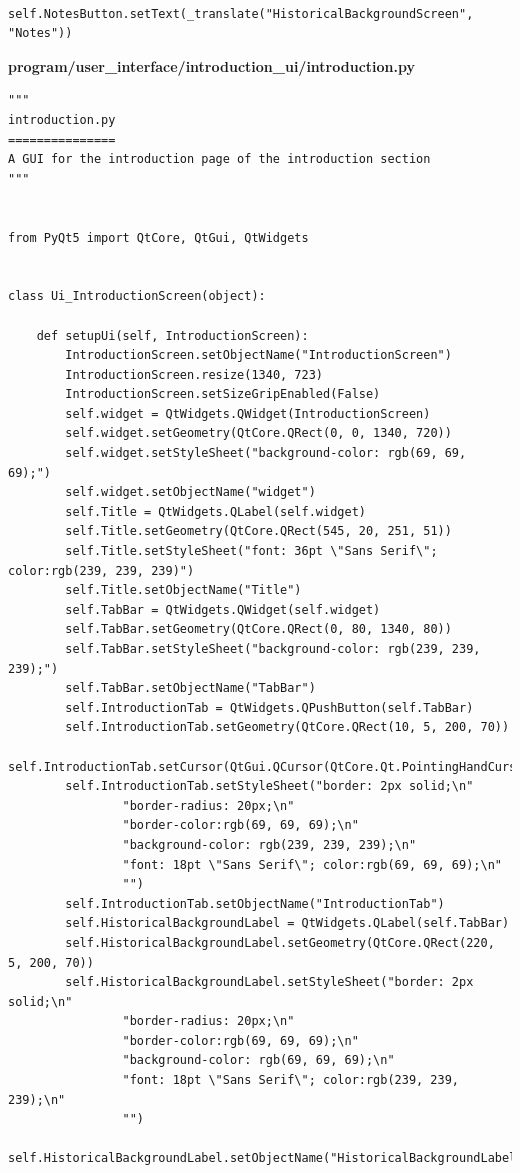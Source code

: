 \documentclass[12pt]{article}
\begin{document}
\begin{lstlisting}
        self.NotesButton.setText(_translate("HistoricalBackgroundScreen", "Notes"))
\end{lstlisting}

\textbf{program/user\_interface/introduction\_ui/introduction.py}
\begin{lstlisting}
"""
introduction.py
===============
A GUI for the introduction page of the introduction section
"""


from PyQt5 import QtCore, QtGui, QtWidgets


class Ui_IntroductionScreen(object):

    def setupUi(self, IntroductionScreen):
        IntroductionScreen.setObjectName("IntroductionScreen")
        IntroductionScreen.resize(1340, 723)
        IntroductionScreen.setSizeGripEnabled(False)
        self.widget = QtWidgets.QWidget(IntroductionScreen)
        self.widget.setGeometry(QtCore.QRect(0, 0, 1340, 720))
        self.widget.setStyleSheet("background-color: rgb(69, 69, 69);")
        self.widget.setObjectName("widget")
        self.Title = QtWidgets.QLabel(self.widget)
        self.Title.setGeometry(QtCore.QRect(545, 20, 251, 51))
        self.Title.setStyleSheet("font: 36pt \"Sans Serif\"; color:rgb(239, 239, 239)")
        self.Title.setObjectName("Title")
        self.TabBar = QtWidgets.QWidget(self.widget)
        self.TabBar.setGeometry(QtCore.QRect(0, 80, 1340, 80))
        self.TabBar.setStyleSheet("background-color: rgb(239, 239, 239);")
        self.TabBar.setObjectName("TabBar")
        self.IntroductionTab = QtWidgets.QPushButton(self.TabBar)
        self.IntroductionTab.setGeometry(QtCore.QRect(10, 5, 200, 70))
        self.IntroductionTab.setCursor(QtGui.QCursor(QtCore.Qt.PointingHandCursor))
        self.IntroductionTab.setStyleSheet("border: 2px solid;\n"
                "border-radius: 20px;\n"
                "border-color:rgb(69, 69, 69);\n"
                "background-color: rgb(239, 239, 239);\n"
                "font: 18pt \"Sans Serif\"; color:rgb(69, 69, 69);\n"
                "")
        self.IntroductionTab.setObjectName("IntroductionTab")
        self.HistoricalBackgroundLabel = QtWidgets.QLabel(self.TabBar)
        self.HistoricalBackgroundLabel.setGeometry(QtCore.QRect(220, 5, 200, 70))
        self.HistoricalBackgroundLabel.setStyleSheet("border: 2px solid;\n"
                "border-radius: 20px;\n"
                "border-color:rgb(69, 69, 69);\n"
                "background-color: rgb(69, 69, 69);\n"
                "font: 18pt \"Sans Serif\"; color:rgb(239, 239, 239);\n"
                "")
        self.HistoricalBackgroundLabel.setObjectName("HistoricalBackgroundLabel")

\end{lstlisting}
\end{document}
